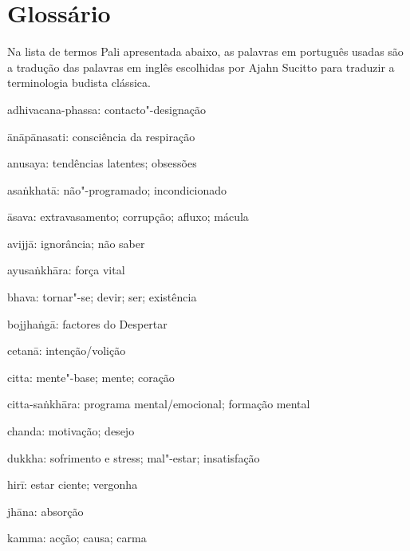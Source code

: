 \chapter{Glossário}

Na lista de termos Pali apresentada abaixo, as palavras em português usadas são
a tradução das palavras em inglês escolhidas por Ajahn Sucitto para traduzir a
terminologia budista clássica.

\begin{glossarydescription}

\item[adhivacana-phassa:] contacto"-designação

\item[ānāpānasati:] consciência da respiração

\item[anusaya:] tendências latentes; obsessões

\item[asaṅkhatā:] não"-programado; incondicionado

\item[āsava:] extravasamento; corrupção; afluxo; mácula

\item[avijjā:] ignorância; não saber

\item[ayusaṅkhāra:] força vital

\item[bhava:] tornar"-se; devir; ser; existência

\item[bojjhaṅgā:] factores do Despertar

\item[cetanā:] intenção/volição

\item[citta:] mente"-base; mente; coração

\item[citta-saṅkhāra:] programa mental/emocional; formação \mbox{mental}

\item[chanda:] motivação; desejo

\item[dukkha:] sofrimento e stress; mal"-estar; insatisfação

\item[hirī:] estar ciente; vergonha

\item[jhāna:] absorção

\item[kamma:] acção; causa; carma


\end{glossarydescription}
